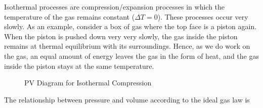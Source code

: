 Isothermal processes are compression/expansion processes in which the temperature of the gas remains constant ($\Delta T = 0$). These processes occur very slowly. As an example, consider a box of gas where the top face is a piston again. When the piston is pushed down very very slowly, the gas inside the piston remains at thermal equilibrium with its surroundings. Hence, as we do work on the gas, an equal amount of energy leaves the gas in the form of heat, and the gas inside the piston stays at the same temperature.

\begin{figure}[H]
	\centering
	\caption{PV Diagram for Isothermal Compression}
\end{figure}

The relationship between pressure and volume according to the ideal gas law is

